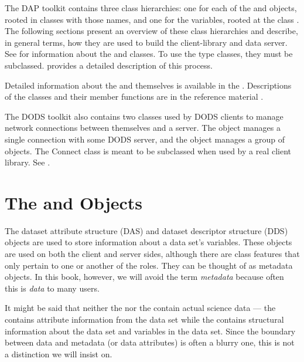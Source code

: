 The DAP toolkit contains three class hierarchies: one for each of the
 and  objects, rooted in classes with those names,
and one for the variables, rooted at the class . The
following sections present an overview of these class hierarchies and
describe, in general terms, how they are used to build the
client-library and data server. See 
for information about the  and  classes.
To use the type classes, they must be subclassed.
 provides a detailed description of this
process.

Detailed information about the  and  themselves
is available in the \OPDuser.  Descriptions of the classes and their
member functions are in the reference material
.

The DODS toolkit also contains two classes used by DODS clients to
manage network connections between themselves and a server. The
 object manages a single connection with some DODS
server, and the  object manages a group of
 objects.  The Connect class is meant to be subclassed
when used by a real client library. See .

\section{The  and  Objects}
\label{tk,das-dds-objects}

  The dataset
attribute structure (DAS) and dataset
descriptor structure (DDS) objects are
used to store information about a data set's variables. These objects
are used on both the client and server sides, although there are class
features that only pertain to one or another of the roles.  They can
be thought of as metadata objects.  In this book, however, we will
avoid the term \emph{metadata} because often this is \emph{data} to
many users.

It might be said that neither the  nor the 
contain actual science data --- the  contains attribute
information from the data set while the  contains
structural information about the data set and variables in the data
set.  Since the boundary between data and metadata (or data
attributes) is often a blurry one, this is not a distinction we will
insist on. 

